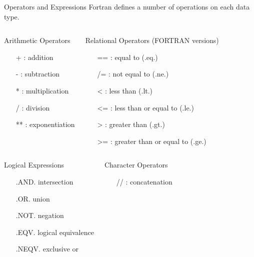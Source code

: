 \documentclass[c,mathserif,compress,xcolor=svgnames]{beamer}
\newenvironment{eblock}[0]
{
\begin{beamerboxesrounded}[upper=uppercol2,lower=lowercol2,shadow=true]}
{\end{beamerboxesrounded}}
\begin{document}
\begin{frame}{Operators and Expressions}
  Fortran defines a number of operations on each data type.
  \begin{columns}[t]
    \begin{eblock}{\scriptsize Arithmetic Operators}
      \begin{itemize}
        \footnotesize
        \item[+]: addition
        \item[-]: subtraction
        \item[*]: multiplication
        \item[/]: division
        \item[**]: exponentiation
      \end{itemize}
    \end{eblock}
    \begin{eblock}{\scriptsize Relational Operators (FORTRAN versions)}
      \begin{itemize}
        \footnotesize
        \item[==]: equal to (.eq.)
        \item[/=]: not equal to (.ne.)
        \item[<]: less than (.lt.)
        \item[<=]: less than or equal to (.le.)
        \item[>]: greater than (.gt.)
        \item[>=]: greater than or equal to (.ge.)
      \end{itemize}
    \end{eblock}
  \end{columns}
  \begin{columns}[t]
    \begin{eblock}{\scriptsize Logical Expressions}
      \begin{itemize}
        \footnotesize
        \item[]{\color{tigerspurple}.AND.} intersection
        \item[]{\color{tigerspurple}.OR.} union
        \item[]{\color{tigerspurple}.NOT.} negation
        \item[]{\color{tigerspurple}.EQV.} logical equivalence
        \item[]{\color{tigerspurple}.NEQV.} exclusive or
      \end{itemize}
    \end{eblock}
    \begin{eblock}{\scriptsize Character Operators}
      \begin{itemize}
        \footnotesize
        \item[//]: concatenation
      \end{itemize}
    \end{eblock}
  \end{columns}
\end{frame}
\end{document}
